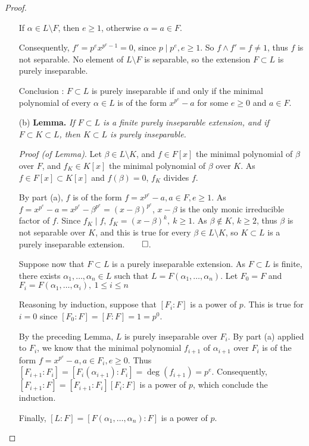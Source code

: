 \documentclass[11pt,a4paper]{article}
\begin{document}
\begin{proof}
\begin{enumerate}
If $\alpha \in L \setminus F$, then $e\geq 1$, otherwise $\alpha = a \in F$.

Consequently, $f' = p^e x^{p^e-1} =0$, since $p \mid p^e, e\geq 1$. So $f \wedge f' = f \neq 1$,  thus $f$ is not separable. No element of $L \setminus F$ is separable, so the extension $F \subset L$ is purely inseparable.

Conclusion : $F \subset L$ is purely inseparable if and only if the minimal polynomial of every $\alpha \in L$ is of the form $x^{p^e} -a$ for some $e\geq 0$ and $a\in F$.

\item[(b)]
{\bf Lemma.} {\it If $F \subset L$ is a finite purely inseparable extension,  and if $F \subset K \subset L$, then $K \subset L$ is purely inseparable.}

{\it Proof (of Lemma)}. Let $\beta \in L\setminus K$, and  $f\in F[x]$ the minimal polynomial of $\beta$ over $F$, and $f_K \in K[x]$ the minimal polynomial of $\beta$ over $K$. As $f \in F[x] \subset K[x]$ and $f(\beta) = 0$, $f_K$ divides $f$.

By part (a), $f$ is of the form $f = x^{p^e} -a, a\in F, e\geq 1$. As $f = x^{p^e} - a = x^{p^e} - \beta^{p^e} = (x-\beta)^{p^e}$, $x-\beta$ is the only monic irreducible factor of $f$. Since $f_K \mid f$, $f_K = (x- \beta)^k,\ k\geq 1$. As $\beta \not \in K$, $k\geq 2$, thus $\beta$ is not separable over $K$, and this is true for every $\beta \in L \setminus K$, so $K \subset L$ is a purely inseparable extension.$\qed$.

\bigskip 

Suppose now that $F \subset L$ is a purely inseparable extension. As $F \subset L$ is finite, there exists $\alpha_1,\ldots,\alpha_n \in L$ such that $L = F(\alpha_1,\ldots,\alpha_n)$. Let $F_0 = F$ and $F_i = F(\alpha_1, \ldots,\alpha_i),\ 1\leq i \leq n$

Reasoning by induction, suppose that $[F_i : F]$ is a power of $p$. This is true for $i=0$ since $[F_0:F] = [F:F] = 1 = p^0$.

By the preceding Lemma, $L$ is purely inseparable over $F_i$. By part (a) applied to $F_i$, we know that the minimal polynomial $f_{i+1}$ of $\alpha_{i+1}$ over $F_i$ is of the form $f = x^{p^e} -a, a\in F_i, e\geq 0$. Thus $[F_{i+1} : F_i] = [F_{i}(\alpha_{i+1}) : F_i] = \deg(f_{i+1}) = p^e$. Consequently, $[F_{i+1}:F] = [F_{i+1}:F_i][F_i:F] $ is a power of $p$, which conclude the induction.

Finally, $[L:F] = [F(\alpha_1,\ldots,\alpha_n) : F]$ is a power of $p$.
\end{enumerate}
\end{proof}
\end{document}

